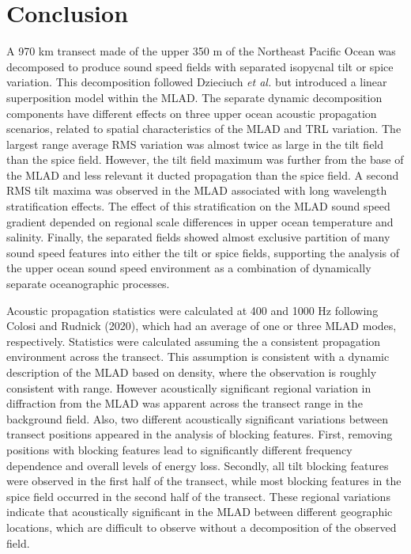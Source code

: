 \documentclass[preprint,NumberedRefs]{JASA}
\begin{document}
\section{Conclusion}\label{sec:conclusion}
A 970 km transect made of the upper 350 m of the Northeast Pacific Ocean was decomposed to produce sound speed fields with separated isopycnal tilt or spice variation. This decomposition followed Dzieciuch \emph{et al.}\citep{dzieciuch2004} but introduced a linear superposition model within the MLAD. The separate dynamic decomposition components have different effects on three upper ocean acoustic propagation scenarios, related to spatial characteristics of the MLAD and TRL variation. The largest range average RMS variation was almost twice as large in the tilt field than the spice field. However, the tilt field maximum was further from the base of the MLAD and less relevant it ducted propagation than the spice field. A second RMS tilt maxima was observed in the MLAD associated with long wavelength stratification effects. The effect of this stratification on the MLAD sound speed gradient depended on regional scale differences in upper ocean temperature and salinity. Finally, the separated fields showed almost exclusive partition of many sound speed features into either the tilt or spice fields, supporting the analysis of the upper ocean sound speed environment as a combination of dynamically separate oceanographic processes.

Acoustic propagation statistics were calculated at 400 and 1000 Hz following Colosi and Rudnick (2020),\cite{colosi2020observations} which had an average of one or three MLAD modes, respectively. Statistics were calculated assuming the a consistent propagation environment across the transect. This assumption is consistent with a dynamic description of the MLAD based on density\citep{cole2010seasonal}, where the observation is roughly consistent with range. However acoustically significant regional variation in diffraction from the MLAD was apparent across the transect range in the background field. Also, two different acoustically significant variations between transect positions appeared in the analysis of blocking features. First, removing positions with blocking features lead to significantly different frequency dependence and overall levels of energy loss. Secondly, all tilt blocking features were observed in the first half of the transect, while most blocking features in the spice field occurred in the second half of the transect. These regional variations indicate that acoustically significant in the MLAD between different geographic locations, which are difficult to observe without a decomposition of the observed field.
\end{document}
